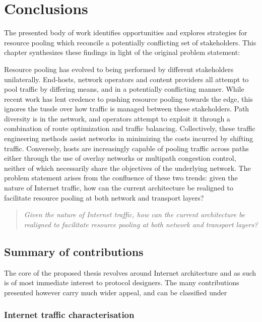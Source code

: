 \chapter{Conclusions}
\label{sec:conclusions}

The presented body of work identifies opportunities and explores strategies for resource pooling which reconcile a potentially conflicting set of stakeholders.
\LOREM
This chapter synthesizes these findings in light of the original problem statement:

Resource pooling has evolved to being performed by different stakeholders unilaterally.
End-hosts, network operators and content providers all attempt to pool traffic by differing means, and in a potentially conflicting manner.
While recent work has lent credence to pushing resource pooling towards the edge, this ignores the tussle over how traffic is managed between these stakeholders.
Path diversity is in the network, and operators attempt to exploit it through a combination of route optimization and traffic balancing.
Collectively, these traffic engineering methods assist networks in minimizing the costs incurred by shifting traffic.
Conversely, hosts are increasingly capable of pooling traffic across paths either through the use of overlay networks or multipath congestion control, neither of which necessarily share the objectives of the underlying network.
The problem statement arises from the confluence of these two trends: given the nature of Internet traffic, how can the current architecture be realigned to facilitate resource pooling at both network and transport layers?

\begin{quote}
\textit{
Given the nature of Internet traffic, how can the current architecture be realigned to facilitate resource pooling at both network and transport layers?
}
\end{quote}

\section{Summary of contributions}

The core of the proposed thesis revolves around Internet architecture and as such is of most immediate interest to protocol designers.
The many contributions presented however carry much wider appeal, and can be classified under 


\subsection{Internet traffic characterisation}

